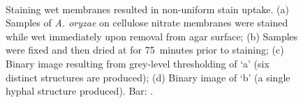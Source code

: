 \begin{figure}[tb]
	\centering
	\hspace{0.5cm}
	\\
	\hspace{0.5cm}
	\caption{Staining wet membranes resulted in non-uniform stain uptake. (a) Samples of \emph{A. oryzae} on cellulose nitrate membranes were stained while wet immediately upon removal from agar surface; (b) Samples were fixed and then dried at  for 75~minutes prior to staining; (c) Binary image resulting from grey-level thresholding of \lq a' (six distinct structures are produced); (d) Binary image of \lq b' (a single hyphal structure produced). Bar: .}
	\label{fig:WetDryStain}
\end{figure}

